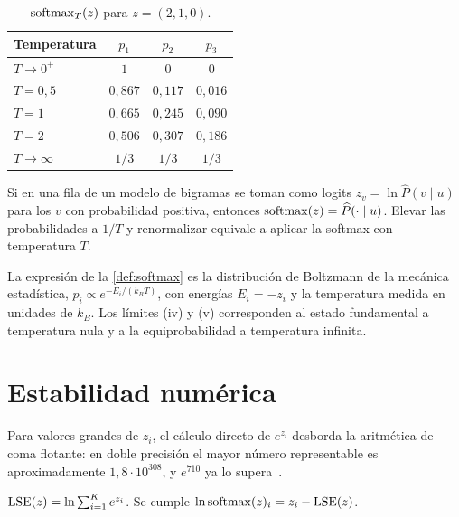 \begin{table}[h]
\centering\small
\caption{$\operatorname{softmax}_T(z)$ para $z=(2,1,0)$.}\label{tab:temperatura}
\begin{tabular}{@{}lccc@{}}
\toprule
Temperatura & $p_1$ & $p_2$ & $p_3$ \\
\midrule
$T\to 0^{+}$ & $1$ & $0$ & $0$ \\
$T=0{,}5$ & $0{,}867$ & $0{,}117$ & $0{,}016$ \\
$T=1$ & $0{,}665$ & $0{,}245$ & $0{,}090$ \\
$T=2$ & $0{,}506$ & $0{,}307$ & $0{,}186$ \\
$T\to\infty$ & $1/3$ & $1/3$ & $1/3$ \\
\bottomrule
\end{tabular}
\end{table}

\begin{observacion}
Si en una fila de un modelo de bigramas se toman como logits $z_v=\ln\widehat{P}(v\mid u)$ para los $v$ con probabilidad positiva, entonces $\operatorname{softmax}(z)=\widehat{P}(\cdot\mid u)$. Elevar las probabilidades a $1/T$ y renormalizar equivale a aplicar la softmax con temperatura $T$.
\end{observacion}

\begin{observacion}
La expresión de la \cref{def:softmax} es la distribución de Boltzmann de la mecánica estadística, $p_i\propto e^{-E_i/(k_BT)}$, con energías $E_i=-z_i$ y la temperatura medida en unidades de $k_B$. Los límites (iv) y (v) corresponden al estado fundamental a temperatura nula y a la equiprobabilidad a temperatura infinita.
\end{observacion}

\section{Estabilidad numérica}

Para valores grandes de $z_i$, el cálculo directo de $e^{z_i}$ desborda la aritmética de coma flotante: en doble precisión el mayor número representable es aproximadamente $1{,}8\cdot 10^{308}$, y $e^{710}$ ya lo supera~\cite[§4.1]{gbc}.

\begin{definicion}
$\operatorname{LSE}(z)=\ln\sum_{i=1}^{K}e^{z_i}$. Se cumple $\ln\operatorname{softmax}(z)_i=z_i-\operatorname{LSE}(z)$.
\end{definicion}

